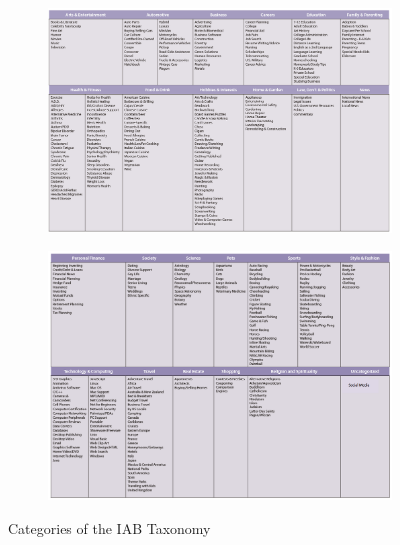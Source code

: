 \begin{figure}[t]
\begin{subfigure}{\textwidth}
\includegraphics[width=\textwidth]{Chapters/Background/Taxonomy-1.png}
\end{subfigure}
\begin{subfigure}{\textwidth}
\centering
\includegraphics[width=\textwidth]{Chapters/Background/Taxonomy-2.png}
\end{subfigure}
\caption{Categories of the IAB Taxonomy}
\label{fig:IAB}
\end{figure}